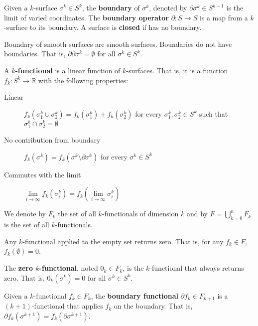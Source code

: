 \documentclass[11pt,letterpaper,fleqn]{memoir}
\begin{document}
\begin{defn}
	Given a $k$-surface $\sigma^k \in S^k$, the \textbf{boundary} of $\sigma^k$, denoted by $\partial\sigma^k \in S^{k-1}$ is the limit of varied coordinates. The \textbf{boundary operator} $\partial : S \to S$ is a map from a $k$-surface to its boundary. A surface is \textbf{closed} if has no boundary.
\end{defn}

\begin{coro}
	Boundary of smooth surfaces are smooth surfaces. Boundaries do not have boundaries. That is, $\partial\partial \sigma^k = \emptyset$ for all $\sigma^k \in S^k$.
\end{coro}


\begin{defn}
	A \textbf{$k$-functional} is a linear function of $k$-surfaces. That is, it is a function $f_k : S^k \to \mathbb{R}$ with the following properties:
	\begin{description}
		\item[Linear] $f_k(\sigma^k_1 \cup \sigma^k_2) = f_k(\sigma^k_1) + f_k(\sigma^k_2)$ for every $\sigma^k_1, \sigma^k_2 \in S^k$ such that $\sigma^k_1 \cap \sigma^k_2 = \emptyset$
		\item[No contribution from boundary] $f_k(\sigma^k) = f_k(\sigma^k \setminus \partial \sigma^k)$ for every $\sigma^k \in S^k$
		\item[Commutes with the limit] $\lim\limits_{i \to \infty} f_k(\sigma_i^k) = f_k(\lim\limits_{i \to \infty}\sigma_i^k)$
	\end{description}
	We denote by $F_k$ the set of all $k$-functionals of dimension $k$ and by $F = \bigcup_{k=0}^nF_k$ is the set of all $k$-functionals.
\end{defn}

\begin{coro}
	Any $k$-functional applied to the empty set returns zero. That is, for any $f_k \in F$, $f_k(\emptyset) = 0$.
\end{coro}

\begin{defn}
	The \textbf{zero $k$-functional}, noted $0_k \in F_k$, is the $k$-functional that always returns zero. That is, $0_k(\sigma^k) = 0$ for all $\sigma^k \in S^k$.
\end{defn}


\begin{defn}
	Given a $k$-functional $f_k \in F_k$, the \textbf{boundary functional} $\partial f_k \in F_{k+1}$ is a $(k+1)$-functional that applies $f_k$ on the boundary. That is, $\partial f_k(\sigma^{k+1}) = f_k(\partial \sigma^{k+1})$. 
\end{defn}
\end{document}
